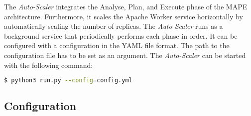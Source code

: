 The \textit{Auto-Scaler} integrates the Analyse, Plan, and Execute phase of the MAPE architecture. Furthermore, it scales the Apache Worker service horizontally by automatically scaling the number of replicas.
The \textit{Auto-Scaler} runs as a background service that periodically performs each phase in order.
It can be configured with a configuration in the YAML file format. The path to the configuration file has to be set as an argument.
The \textit{Auto-Scaler} can be started with the following command:
\begin{lstlisting}[label=lst:06_auto-scaler_start, caption=Auto-Scaler start command, language=sh, numbers=none]
$ python3 run.py --config=config.yml
\end{lstlisting}


\subsection{Configuration}
